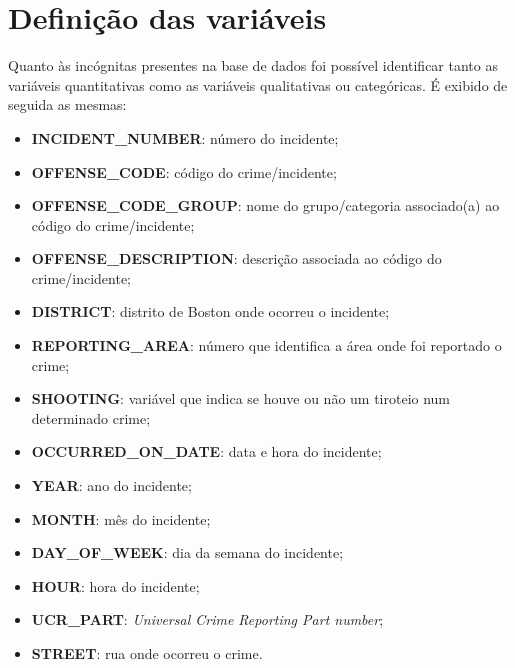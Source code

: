 \documentclass[a4paper]{report}
\begin{document}
{	\section{Definição das variáveis}
	Quanto às incógnitas presentes na base de dados foi possível identificar tanto as variáveis quantitativas como as variáveis qualitativas ou categóricas. É exibido de 
	seguida as mesmas:
    \begin{itemize}
	    \item \textbf{INCIDENT\_NUMBER}: número do incidente;
	    \item \textbf{OFFENSE\_CODE}: código do crime/incidente;
	    \item \textbf{OFFENSE\_CODE\_GROUP}: nome do grupo/categoria associado(a) ao código do crime/incidente;
	    \item \textbf{OFFENSE\_DESCRIPTION}: descrição associada ao código do crime/incidente;
	    \item \textbf{DISTRICT}: distrito de Boston onde ocorreu o incidente;
	    \item \textbf{REPORTING\_AREA}: número que identifica a área onde foi reportado o crime;
	    \item \textbf{SHOOTING}: variável que indica se houve ou não um tiroteio num determinado crime;
	    \item \textbf{OCCURRED\_ON\_DATE}: data e hora do incidente;
	    \item \textbf{YEAR}: ano do incidente;
	    \item \textbf{MONTH}: mês do incidente;
	    \item \textbf{DAY\_OF\_WEEK}: dia da semana do incidente;
	    \item \textbf{HOUR}: hora do incidente;
	    \item \textbf{UCR\_PART}: \textit{Universal Crime Reporting Part number};
	    \item \textbf{STREET}: rua onde ocorreu o crime.
    \end{itemize}
	
}
\end{document}
